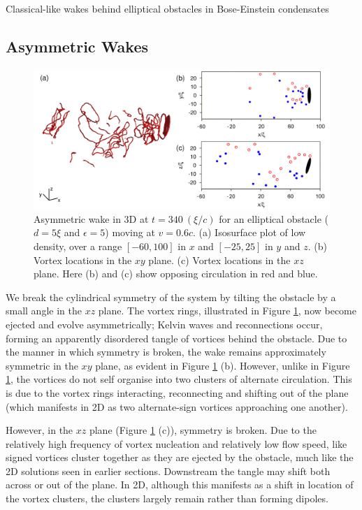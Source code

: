 \begin{chapter}{\label{cha:wake}Classical-like wakes behind elliptical obstacles in Bose-Einstein condensates}
\subsection{Asymmetric Wakes}
\begin{figure}
\centering
\includegraphics[width=\textwidth]{wake/figure8}
\caption{\label{fig:3d4} Asymmetric wake in 3D at $t=340~(\xi/c)$ for an elliptical obstacle ($d=5\xi$ and $\epsilon=5$) moving at $v=0.6c$. (a) Isosurface plot of low density, over a range $[-60,100]$ in $x$ and $[-25,25]$ in $y$ and $z$. (b) Vortex locations in the $xy$ plane.  (c) Vortex locations in the $xz$ plane.  Here (b) and (c) show opposing circulation in red and blue.}
\end{figure}

We break the cylindrical symmetry of the system by tilting the obstacle by a small angle in the $xz$ plane.  The vortex rings, illustrated in Figure \ref{fig:3d4}, now become ejected and evolve asymmetrically; Kelvin waves and reconnections occur, forming an apparently disordered tangle of vortices behind the obstacle.  Due to the manner in which symmetry is broken, the wake remains approximately symmetric in the $xy$ plane, as evident in Figure \ref{fig:3d4} (b).  However, unlike in Figure \ref{fig:3d4}, the vortices do not self organise into two clusters of alternate circulation. This is due to the vortex rings interacting, reconnecting and shifting out of the plane (which manifests in 2D as two alternate-sign vortices approaching one another).



However, in the $xz$ plane (Figure \ref{fig:3d4} (c)), symmetry is broken. Due to the relatively high frequency of vortex nucleation and relatively low flow speed, like signed vortices cluster together as they are ejected by the obstacle, much like the 2D solutions seen in earlier sections.  Downstream the tangle may shift both across or out of the plane. In 2D, although this manifests as a shift in location of the vortex clusters, the clusters largely remain rather than forming dipoles. 


\end{chapter}
